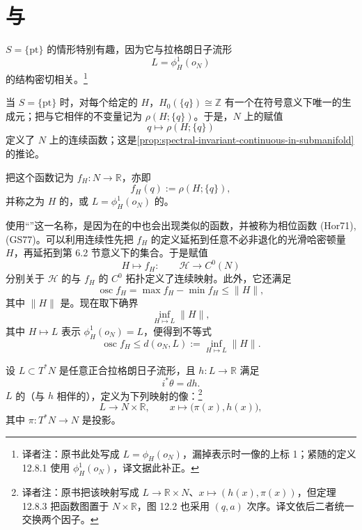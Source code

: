 \section{\termWaveFront{}与\termBasicPhaseFunction{}}
\label{sec:wave-front-basic-phase-function}

$S=\{\mathrm{pt}\}$ 的情形特别有趣，因为它与拉格朗日子流形
\[
  L=\phi_H^1(o_N)
\]
的\emph{\termWaveFront{}}结构密切相关。\footnote{译者注：原书此处写成 $L=\phi_H(o_N)$，漏掉表示时一像的上标 1；紧随的定义 12.8.1 使用 $\phi_H^1(o_N)$，译文据此补正。}

当 $S=\{\mathrm{pt}\}$ 时，对每个给定的 $H$，$H_0(\{q\})\cong\mathbb Z$ 有一个在符号意义下唯一的生成元；把与它相伴的不变量记为 $\rho(H;\{q\})$。于是，$N$ 上的赋值
\[
  q\longmapsto\rho(H;\{q\})
\]
定义了 $N$ 上的连续函数；这是\cref{prop:spectral-invariant-continuous-in-submanifold}的推论。

\begin{definition}
\label{def:basic-phase-function}
把这个函数记为 $f_H:N\to\mathbb R$，亦即
\[
  f_H(q):=\rho(H;\{q\}),
\]
并称之为 $H$ 的\emph{\termBasicPhaseFunction{}}，或 $L=\phi_H^1(o_N)$ 的\termBasicPhaseFunction{}。
\end{definition}

使用“\termPhaseFunction{}”这一名称，是因为在\termFourierIntegralOperator{}的\termMicrolocalAnalysis{}中也会出现类似的函数，并被称为相位函数 (Hor71), (GS77)。可以利用连续性先把 $f_H$ 的定义延拓到任意不必非退化的光滑哈密顿量 $H$，再延拓到第 6.2 节意义下的\termTopologicalHamiltonian{}集合。于是赋值
\[
  H\longmapsto f_H:
  \qquad
  \mathcal H\longrightarrow C^0(N)
\]
分别关于 $\mathcal H$ 的\termHamiltonianTopology{}与 $f_H$ 的 $C^0$ 拓扑定义了连续映射。此外，它还满足
\[
  \operatorname{osc}f_H
  =\max f_H-\min f_H
  \le\lVert H\rVert,
\]
其中 $\lVert H\rVert$ 是\termHoferNorm{}。现在取下确界
\[
  \inf_{H\mapsto L}\lVert H\rVert,
\]
其中 $H\mapsto L$ 表示 $\phi_H^1(o_N)=L$，便得到不等式
\begin{equation}
  \operatorname{osc}f_H
  \le d(o_N,L)
  :=\inf_{H\mapsto L}\lVert H\rVert.
\label{eq:basic-phase-oscillation-hofer-distance}
\end{equation}

\begin{definition}
\label{def:wave-front-exact-lagrangian}
设 $L\subset T^*N$ 是任意正合拉格朗日子流形，且 $h:L\to\mathbb R$ 满足
\[
  i^*\theta=dh.
\]
$L$ 的（与 $h$ 相伴的）\termWaveFront{}，定义为下列映射的像：\footnote{译者注：原书把该映射写成 $L\to\mathbb R\times N$、$x\mapsto(h(x),\pi(x))$，但定理 12.8.3 把函数图置于 $N\times\mathbb R$，图 12.2 也采用 $(q,a)$ 次序。译文依后二者统一交换两个因子。}
\[
  L\longrightarrow N\times\mathbb R,
  \qquad
  x\longmapsto\bigl(\pi(x),h(x)\bigr),
\]
其中 $\pi:T^*N\to N$ 是投影。
\end{definition}


